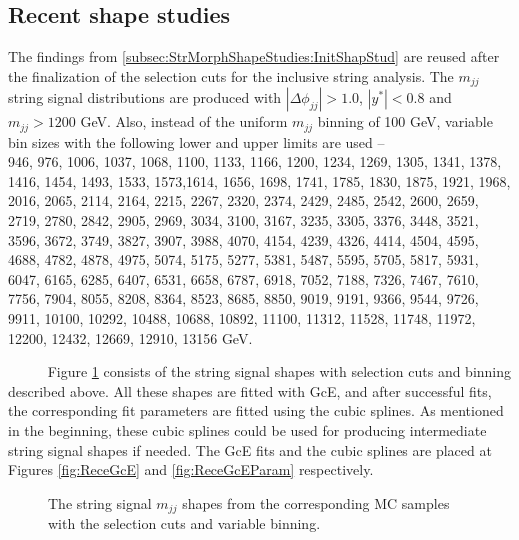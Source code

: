 
\subsection{Recent shape studies}
The findings from \ref{subsec:StrMorphShapeStudies:InitShapStud} are reused after the finalization of the selection cuts for the inclusive string analysis. The $m_{jj}$ string signal distributions are produced with $|\Delta\phi_{jj}|>1.0$, $|y^*|<0.8$ and $m_{jj}>1200$ GeV. Also, instead of the uniform $m_{jj}$ binning of 100 GeV, variable bin sizes with the following lower and upper limits are used -- \\

946, 976, 1006, 1037, 1068, 1100, 1133, 1166, 1200, 1234, 1269, 1305, 1341, 1378, 1416, 1454, 1493, 1533, 1573,1614, 1656, 1698, 1741, 1785, 1830, 1875, 1921, 1968, 2016, 2065, 2114, 2164, 2215, 2267, 2320, 2374, 2429, 2485, 2542, 2600, 2659, 2719, 2780, 2842, 2905, 2969, 3034, 3100, 3167, 3235, 3305, 3376, 3448, 3521, 3596, 3672, 3749, 3827, 3907, 3988, 4070, 4154, 4239, 4326, 4414, 4504, 4595, 4688, 4782, 4878, 4975, 5074, 5175, 5277, 5381, 5487, 5595, 5705, 5817, 5931, 6047, 6165, 6285, 6407, 6531, 6658, 6787, 6918, 7052, 7188, 7326, 7467, 7610, 7756, 7904, 8055, 8208, 8364, 8523, 8685, 8850, 9019, 9191, 9366, 9544, 9726, 9911, 10100, 10292, 10488, 10688, 10892, 11100, 11312, 11528, 11748, 11972, 12200, 12432, 12669, 12910, 13156 GeV.
   
~~~~~ Figure \ref{fig:ReceStrmjj} consists of the string signal shapes with selection cuts and binning described above. All these shapes are fitted with GcE, and after successful fits, the corresponding fit parameters are fitted using the cubic splines. As mentioned in the beginning, these cubic splines could be used for producing intermediate string signal shapes if needed. The GcE fits and the cubic splines are placed at Figures \ref{fig:ReceGcE} and \ref{fig:ReceGcEParam} respectively. 

\clearpage

\begin{figure}[!htb]
  \centering
  \caption{The string signal $m_{jj}$ shapes from the corresponding MC samples with the selection cuts and variable binning.}
  \label{fig:ReceStrmjj}
\end{figure}

